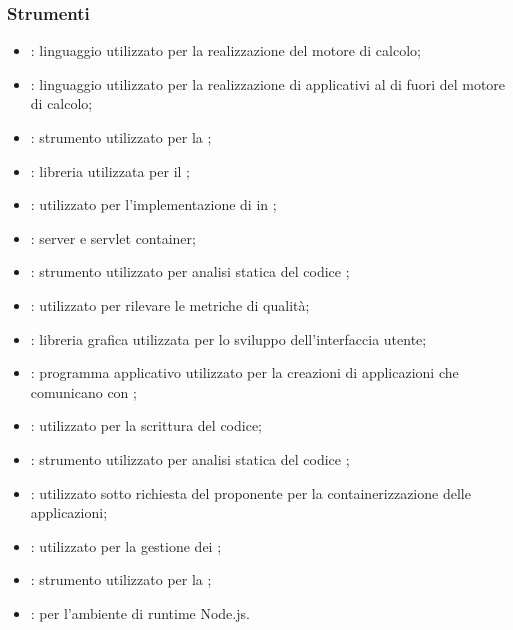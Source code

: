     \subsubsection{Strumenti}
    \begin{itemize}
        \item \textbf{}: linguaggio utilizzato per la realizzazione del motore di calcolo;
        \item \textbf{}: linguaggio utilizzato per la realizzazione di applicativi al di fuori del motore di calcolo;
        \item \textbf{}: strumento utilizzato per la ;
        \item \textbf{}: libreria utilizzata per il ;
        \item \textbf{}:  utilizzato per l'implementazione di  in ;
        \item \textbf{}: server  e servlet container;
        \item \textbf{}: strumento utilizzato per analisi statica del codice ;
        \item \textbf{}: utilizzato per rilevare le metriche di qualità;
        \item \textbf{}: libreria grafica utilizzata per lo sviluppo dell'interfaccia utente;
        \item \textbf{}: programma applicativo utilizzato per la creazioni di applicazioni  che comunicano con ;
        \item \textbf{}:  utilizzato per la scrittura del codice;
        \item \textbf{}: strumento utilizzato per analisi statica del codice ;
        \item \textbf{}: utilizzato sotto richiesta del proponente per la containerizzazione delle applicazioni;
        \item \textbf{}: utilizzato per la gestione dei ;
        \item \textbf{}: strumento utilizzato per la ;
        \item \textbf{}:  per l'ambiente di runtime Node.js.
    \end{itemize}

